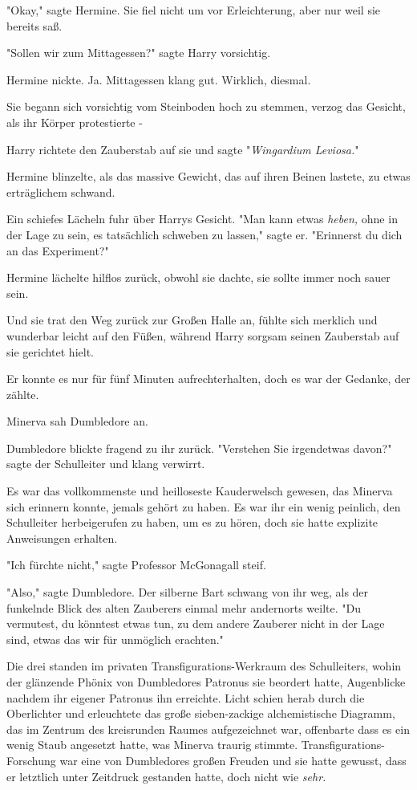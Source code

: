 {"Okay," sagte Hermine. Sie fiel nicht um vor Erleichterung, aber nur weil sie bereits saß.

"Sollen wir zum Mittagessen?" sagte Harry vorsichtig.

Hermine nickte. Ja. Mittagessen klang gut. Wirklich, diesmal.

Sie begann sich vorsichtig vom Steinboden hoch zu stemmen, verzog das Gesicht, als ihr Körper protestierte -

Harry richtete den Zauberstab auf sie und sagte "\emph{Wingardium Leviosa.}"

Hermine blinzelte, als das massive Gewicht, das auf ihren Beinen lastete, zu etwas erträglichem schwand.

Ein schiefes Lächeln fuhr über Harrys Gesicht. "Man kann etwas \emph{heben,} ohne in der Lage zu sein, es tatsächlich schweben zu lassen," sagte er. "Erinnerst du dich an das Experiment?"

Hermine lächelte hilflos zurück, obwohl sie dachte, sie sollte immer noch sauer sein.

Und sie trat den Weg zurück zur Großen Halle an, fühlte sich merklich und wunderbar leicht auf den Füßen, während Harry sorgsam seinen Zauberstab auf sie gerichtet hielt.

Er konnte es nur für fünf Minuten aufrechterhalten, doch es war der Gedanke, der zählte.

\later

Minerva sah Dumbledore an.

Dumbledore blickte fragend zu ihr zurück. "Verstehen Sie irgendetwas davon?" sagte der Schulleiter und klang verwirrt.

Es war das vollkommenste und heilloseste Kauderwelsch gewesen, das Minerva sich erinnern konnte, jemals gehört zu haben. Es war ihr ein wenig peinlich, den Schulleiter herbeigerufen zu haben, um es zu hören, doch sie hatte explizite Anweisungen erhalten.

"Ich fürchte nicht," sagte Professor McGonagall steif.

"Also," sagte Dumbledore. Der silberne Bart schwang von ihr weg, als der funkelnde Blick des alten Zauberers einmal mehr andernorts weilte. "Du vermutest, du könntest etwas tun, zu dem andere Zauberer nicht in der Lage sind, etwas das wir für unmöglich erachten."

Die drei standen im privaten Transfigurations-Werkraum des Schulleiters, wohin der glänzende Phönix von Dumbledores Patronus sie beordert hatte, Augenblicke nachdem ihr eigener Patronus ihn erreichte. Licht schien herab durch die Oberlichter und erleuchtete das große sieben-zackige alchemistische Diagramm, das im Zentrum des kreisrunden Raumes aufgezeichnet war, offenbarte dass es ein wenig Staub angesetzt hatte, was Minerva traurig stimmte. Transfigurations-Forschung war eine von Dumbledores großen Freuden und sie hatte gewusst, dass er letztlich unter Zeitdruck gestanden hatte, doch nicht wie \emph{sehr.}

}
